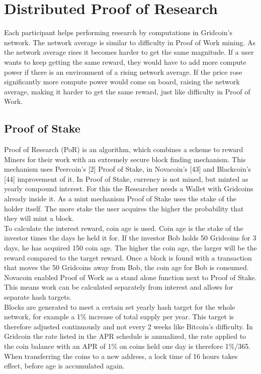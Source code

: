 \section{Distributed Proof of Research}

Each participant helps performing research by computations in Gridcoin's network. The network average is similar to difficulty in Proof of Work mining. As the network average rises it becomes harder to get the same magnitude. If a user wants to keep getting the same reward, they would have to add more compute power if there is an environment of a rising network average. If the price rose significantly more compute power would come on board, raising the network average, making it harder to get the same reward, just like difficulty in Proof of Work.

\subsection{Proof of Stake}

Proof of Research (PoR) is an algorithm, which combines a scheme to reward Miners for their work with an extremely secure block finding mechanism. This mechanism uses Peercoin's [2] Proof of Stake, in Novacoin's [43] and Blackcoin's [44] improvement of it. In Proof of Stake, currency is not mined, but minted as yearly compound interest. For this the Researcher needs a Wallet with Gridcoins already inside it. As a mint mechanism Proof of Stake uses the stake of the holder itself. The more stake the user acquires the higher the probability that they will mint a block.\\

To calculate the interest reward, coin age is used. Coin age is the stake of the investor times the days he held it for. If the investor Bob holds 50 Gridcoins for 3 days, he has acquired 150 coin age. The higher the coin age, the larger will be the reward compared to the target reward. Once a block is found with a transaction that moves the 50 Gridcoins away from Bob, the coin age for Bob is consumed.\\

Novacoin enabled Proof of Work as a stand alone function next to Proof of Stake. This means work can be calculated separately from interest and allows for separate hash targets.\\

Blocks are generated to meet a certain set yearly hash target for the whole network, for example a 1\% increase of total supply per year. This target is therefore adjusted continuously and not every 2 weeks like Bitcoin's difficulty. In Gridcoin the rate listed in the APR schedule is annualized, the rate applied to the coin balance with an APR of 1\% on coins held one day is therefore 1\%/365. When transferring the coins to a new address, a lock time of 16 hours takes effect, before age is accumulated again.\\

